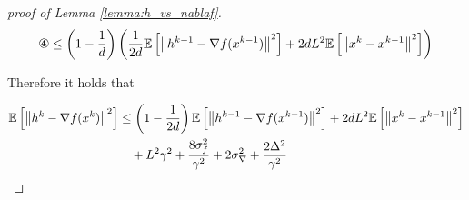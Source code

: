\begin{proof}[proof of Lemma \ref{lemma:h_vs_nablaf}]
        \begin{equation*}
            \circledFour \leq \left(1 - \frac{1}{d}\right) \left(\frac{1}{2d} \expect{\norms{h^{k-1} - \nabla f(x^{k-1})}^2} + 2d L^2 \expect{\norms{x^k - x^{k-1}}^2}\right)
        \end{equation*}

        Therefore it holds that

        \begin{equation*}
        \begin{split}
            \mathbb{E}\left[ \left\| h^{k} - \nabla f(x^{k}) \right\|^2 \right]
            &\leq
            \left(1 - \frac{1}{2 d}\right) \mathbb{E}\left[ \left\| h^{k-1} - \nabla f(x^{k-1}) \right\|^2 \right]
            + 2d L^2 \mathbb{E}\left[ \left\| x^k - x^{k-1} \right\|^2 \right]
            \\&\quad+ L^2 \gamma^2 
            + \frac{8 \sigma_f^2}{\gamma^2} 
            + 2 \sigma_{\nabla}^2 + \frac{2 \Delta^2}{\gamma^2}
        \end{split}
        \end{equation*}

    \end{proof}

